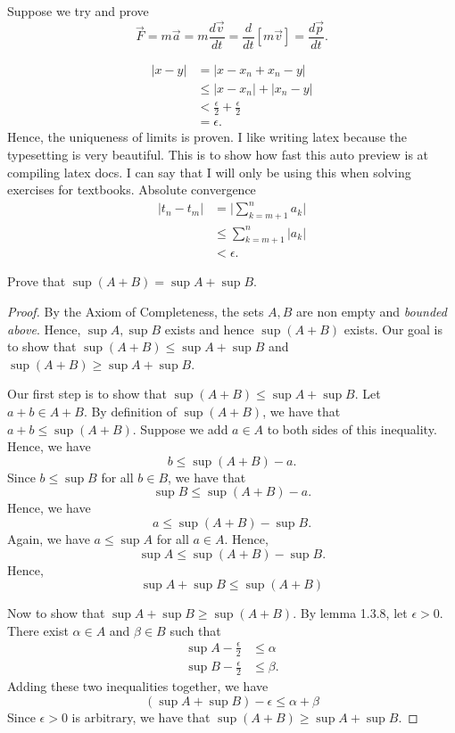 \documentclass{article}
\begin{document}
Suppose we try and prove 
\[ \vec{F} = m \vec{a} = m \frac{d \vec{v}}{dt} = \frac{d}{dt}[m\vec{v}] = \frac{d\vec{p}}{dt}. \]

\begin{align*}
    |x - y |&= |x - x_n + x_n - y | \\
            &\leq |x - x_n| + |x_n -y| \\
            &< \frac{\epsilon}{2} + \frac{\epsilon}{2} \\
            &= \epsilon.
\end{align*}
Hence, the uniqueness of limits is proven. I like writing latex because the typesetting is very beautiful.  
This is to show how fast this auto preview is at compiling latex docs. 
I can say that I will only be using this when solving exercises for textbooks. 
Absolute convergence
\begin{align*}
    |t_n - t_m |&= \Big| \sum_{k=m+1}^{n} a_k  \Big|   \\
                &\leq \sum_{k=m+1}^{n} |a_k| \\ 
                &< \epsilon.
\end{align*}

Prove that \( \sup (A + B ) = \sup A + \sup B \).

\begin{tcolorbox}
    \begin{proof}
    By the Axiom of Completeness, the sets \( A,B \) are non empty and \textit{bounded above}. Hence, \( \sup A, \sup B \) exists and hence \( \sup ( A + B )\) exists.  Our goal is to show that \( \sup (A + B) \leq \sup A + \sup B \) and \( \sup ( A + B ) \geq \sup A + \sup B \). 

    Our first step is to show that \( \sup (A+B) \leq \sup A + \sup B \). Let \( a + b \in A + B \). By definition of \( \sup (A+B)\), we have that \( a + b \leq \sup (A+B)\). Suppose we add \( a \in A \) to both sides of this inequality. Hence, we have 
    \[ b \leq \sup (A +B ) - a.\]
    Since \( b \leq \sup B \) for all \( b \in B \), we have that 
    \[ \sup B \leq \sup (A+B) - a. \]
    Hence, we have 
    \[ a \leq \sup (A+B) - \sup B. \]
    Again, we have \( a \leq \sup A \) for all \( a \in A \). Hence, 
    \[ \sup A \leq \sup (A+B) - \sup B. \]
    Hence, 
    \[ \sup A + \sup B \leq \sup (A+B)\]  

    Now to show that \( \sup A + \sup B \geq \sup (A +B )\). By lemma 1.3.8, let \( \epsilon > 0 \). There exist \( \alpha \in A \) and \( \beta \in B \) such that 
    \begin{align*}
        \sup A - \frac{\epsilon}{2} &\leq \alpha \\
        \sup B - \frac{\epsilon}{2} &\leq \beta.  
    \end{align*}
    Adding these two inequalities together, we have
    \[ ( \sup A + \sup B ) - \epsilon \leq \alpha + \beta \]
    Since \( \epsilon > 0 \) is arbitrary, we have that \( \sup (A +B ) \geq \sup A + \sup B\).
    \end{proof} 
\end{tcolorbox}
\end{document}
